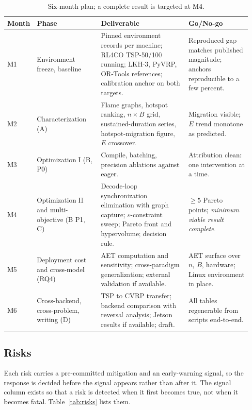 \documentclass[11pt,a4paper,twocolumn]{article}
\begin{document}
\begin{table}[!tb]
\centering
\footnotesize
\begin{tabular}{@{}p{}p{}p{}p{}@{}}
\toprule
\textbf{Month} & \textbf{Phase} & \textbf{Deliverable} & \textbf{Go/No-go} \\
\midrule
M1 & Environment freeze, baseline & Pinned environment records per machine; RL4CO
TSP-50/100 running; LKH-3, PyVRP, OR-Tools references; calibration anchor on both
targets. & Reproduced gap matches published magnitude; anchors reproducible to a
few percent. \\
M2 & Characterization (A) & Flame graphs, hotspot ranking, $n \times B$ grid,
sustained-duration series, hotspot-migration figure, $E$ crossover. & Migration
visible; $E$ trend monotone as predicted. \\
M3 & Optimization I (B, P0) & Compile, batching, precision ablations against eager.
& Attribution clean: one intervention at a time. \\
M4 & Optimization II and multi-objective (B P1, C) & Decode-loop synchronization
elimination with graph capture; $\varepsilon$-constraint sweep; Pareto front and
hypervolume; decision rule. & $\ge 5$ Pareto points; \emph{minimum viable result
complete}. \\
M5 & Deployment cost and cross-model (RQ4) & AET computation and sensitivity;
cross-paradigm generalization; external validation if available. & AET surface over
$n$, $B$, hardware; Linux environment in place. \\
M6 & Cross-backend, cross-problem, writing (D) & TSP to CVRP transfer; backend
comparison with reversal analysis; Jetson results if available; draft. & All tables
regenerable from scripts end-to-end. \\
\bottomrule
\end{tabular}
\caption{Six-month plan; a complete result is targeted at M4.}
\label{tab:timeline}
\end{table}

\subsection{Risks}

Each risk carries a pre-committed mitigation and an early-warning signal, so the
response is decided before the signal appears rather than after it. The signal
column exists so that a risk is detected when it first becomes true, not when it
becomes fatal. Table~\ref{tab:risks} lists them.
\end{document}
